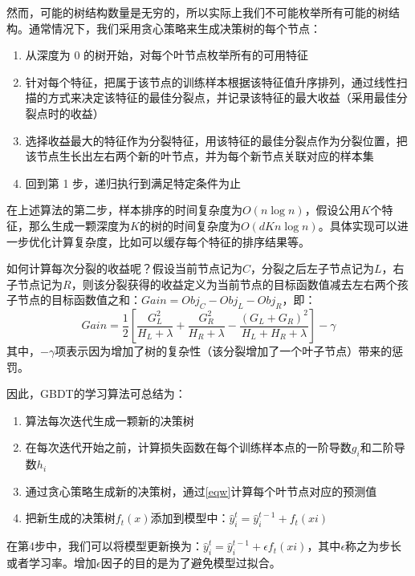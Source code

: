 \documentclass[a4paper]{article}
\begin{document}
然而，可能的树结构数量是无穷的，所以实际上我们不可能枚举所有可能的树结构。通常情况下，我们采用贪心策略来生成决策树的每个节点：
\begin{enumerate}
\item 从深度为 0 的树开始，对每个叶节点枚举所有的可用特征
\item 针对每个特征，把属于该节点的训练样本根据该特征值升序排列，通过线性扫描的方式来决定该特征的最佳分裂点，并记录该特征的最大收益（采用最佳分裂点时的收益）
\item 选择收益最大的特征作为分裂特征，用该特征的最佳分裂点作为分裂位置，把该节点生长出左右两个新的叶节点，并为每个新节点关联对应的样本集
\item 回到第 1 步，递归执行到满足特定条件为止
\end{enumerate}

在上述算法的第二步，样本排序的时间复杂度为$O(n\log n)$，假设公用$K$个特征，那么生成一颗深度为$ K $的树的时间复杂度为$ O(dKn\log n)$。具体实现可以进一步优化计算复杂度，比如可以缓存每个特征的排序结果等。

如何计算每次分裂的收益呢？假设当前节点记为$C$，分裂之后左子节点记为$L$，右子节点记为$R$，则该分裂获得的收益定义为当前节点的目标函数值减去左右两个孩子节点的目标函数值之和：$Gain=Obj_C-Obj_L-Obj_R$，即：
\begin{equation}\label{eqgain}
Gain=\frac{1}{2}\left[ \frac{G_L^2}{H_L+\lambda}+\frac{G_R^2}{H_R+\lambda}-\frac{(G_L+G_R)^2}{H_L+H_R+\lambda} \right]-\gamma
\end{equation}
其中，$-\gamma$项表示因为增加了树的复杂性（该分裂增加了一个叶子节点）带来的惩罚。

因此，GBDT的学习算法可总结为：
\begin{enumerate}
\item 算法每次迭代生成一颗新的决策树
\item 在每次迭代开始之前，计算损失函数在每个训练样本点的一阶导数$ g_i $和二阶导数$h_i$
\item 通过贪心策略生成新的决策树，通过\ref{eqw}计算每个叶节点对应的预测值
\item 把新生成的决策树$ f_t(x) $添加到模型中：$\hat{y}^t_i=\hat{y}^{t-1}_i+f_t(xi)$
\end{enumerate}

在第4步中，我们可以将模型更新换为：$\hat{y}^t_i=\hat{y}^{t-1}_i+\epsilon f_t(xi)$，其中$\epsilon$称之为步长或者学习率。增加$\epsilon$因子的目的是为了避免模型过拟合。

\newpage
\printbibliography[title=参考文献]
\end{document}
